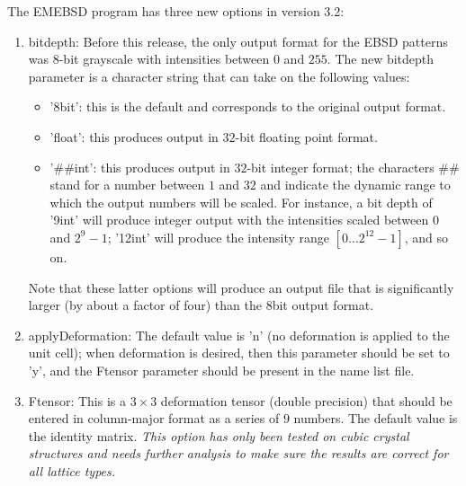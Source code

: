 \documentclass[DIV=calc, paper=letter, fontsize=11pt]{scrartcl}	 %
\begin{document}
The \textsf{EMEBSD} program has three new options in version 3.2:
\begin{enumerate}
	\item \textsf{bitdepth}: Before this release, the only output format for the EBSD patterns was 8-bit grayscale with intensities between $0$ and $255$.  The
	new \textsf{bitdepth} parameter is a character string that can take on the following values:
	\begin{itemize}
		\item \textsf{'8bit'}: this is the default and corresponds to the original output format.
		\item \textsf{'float'}: this produces output in $32$-bit floating point format.
		\item \textsf{'\#\#int'}: this produces output in $32$-bit integer format; the characters \#\# stand for a number between $1$ and $32$ and indicate 
		the dynamic range to which the output numbers will be scaled.  For instance, a bit depth of \textsf{'9int'} will produce integer output with the 
		intensities scaled between $0$ and $2^9-1$; \textsf{'12int'} will produce the intensity range $[0\ldots 2^{12}-1]$, and so on.
	\end{itemize}
	Note that these latter options will produce an output file that is significantly larger (by about a factor of four) than the \textsf{8bit} output format.
	\item \textsf{applyDeformation}:  The default value is \textsf{'n'} (no deformation is applied to the unit cell); when deformation is desired, then this parameter 
	should be set to \textsf{'y'}, and the \textsf{Ftensor} parameter should be present in the name list file.
	\item \textsf{Ftensor}: This is a $3\times 3$ deformation tensor (double precision) that should be entered in column-major format as a series of $9$ numbers.
	The default value is the identity matrix.  \textit{{\color{blue}This option has only been tested on cubic crystal structures and needs further analysis to make sure the results
	are correct for all lattice types.}}
	

\end{enumerate}
\end{document}
